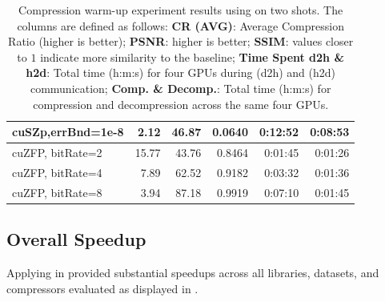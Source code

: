 \documentclass[Ingles]{ic-tese-v3}
\begin{document}
\begin{table}[h!]
\begin{tabular}{|lrrrrr|}
\multicolumn{1}{|l|}{cuSZp,errBnd=1e-8} &
  \multicolumn{1}{r|}{2.12} &
  \multicolumn{1}{r|}{46.87} &
  \multicolumn{1}{r|}{0.0640} &
  \multicolumn{1}{r|}{0:12:52} &
  0:08:53 \\ \hline
\multicolumn{1}{|l|}{cuZFP, bitRate=2} &
  \multicolumn{1}{r|}{15.77} &
  \multicolumn{1}{r|}{43.76} &
  \multicolumn{1}{r|}{0.8464} &
  \multicolumn{1}{r|}{0:01:45} &
  0:01:26 \\ \hline
\multicolumn{1}{|l|}{cuZFP, bitRate=4} &
  \multicolumn{1}{r|}{7.89} &
  \multicolumn{1}{r|}{62.52} &
  \multicolumn{1}{r|}{0.9182} &
  \multicolumn{1}{r|}{0:03:32} &
  0:01:36 \\ \hline
\multicolumn{1}{|l|}{cuZFP, bitRate=8} &
  \multicolumn{1}{r|}{3.94} &
  \multicolumn{1}{r|}{87.18} &
  \multicolumn{1}{r|}{0.9919} &
  \multicolumn{1}{r|}{0:07:10} &
  0:01:45 \\ \hline
\end{tabular}
\caption[Compression warm-up experiments results]{Compression warm-up experiment results using \awave on two shots. The columns are defined as follows: \textbf{CR (AVG)}: Average Compression Ratio (higher is better); \textbf{PSNR}: higher is better; \textbf{SSIM}: values closer to $1$ indicate more similarity to the baseline; \textbf{Time Spent d2h \& h2d}: Total time (h:m:s) for four GPUs during \dth (d2h) and \htd (h2d) communication; \textbf{Comp. \& Decomp.}: Total time (h:m:s) for compression and decompression across the same four GPUs.}
\label{tab:warmup}
\end{table}


\subsection{Overall Speedup}
\label{sec:comp_speedup}

Applying \compression in \awave provided substantial speedups across all \checkpointing libraries, datasets, and compressors evaluated as displayed in .
\end{document}

